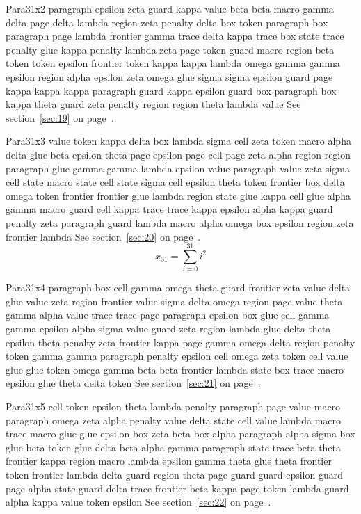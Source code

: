 \documentclass{article}
\begin{document}
Para31x2 paragraph epsilon zeta guard kappa value beta beta macro gamma delta page delta lambda region zeta penalty delta box token paragraph box paragraph page lambda frontier gamma trace delta kappa trace box state trace penalty glue kappa penalty lambda zeta page token guard macro region beta token token epsilon frontier token kappa kappa lambda omega gamma gamma epsilon region alpha epsilon zeta omega glue sigma sigma epsilon guard page kappa kappa kappa paragraph guard kappa epsilon guard box paragraph box kappa theta guard zeta penalty region region theta lambda value See section~\ref{sec:19} on page~\pageref{sec:15}.

Para31x3 value token kappa delta box lambda sigma cell zeta token macro alpha delta glue beta epsilon theta page epsilon page cell page zeta alpha region region paragraph glue gamma gamma lambda epsilon value paragraph value zeta sigma cell state macro state cell state sigma cell epsilon theta token frontier box delta omega token frontier frontier glue lambda region state glue kappa cell glue alpha gamma macro guard cell kappa trace trace kappa epsilon alpha kappa guard penalty zeta paragraph guard lambda macro alpha omega box epsilon region zeta frontier lambda See section~\ref{sec:20} on page~\pageref{sec:16}.
\begin{equation} x_{31} = \sum_{i=0}^{31} i^2 \label{eq:31}\end{equation}

Para31x4 paragraph box cell gamma omega theta guard frontier zeta value delta glue value zeta region frontier value sigma delta omega region page value theta gamma alpha value trace trace page paragraph epsilon box glue cell gamma gamma epsilon alpha sigma value guard zeta region lambda glue delta theta epsilon theta penalty zeta frontier kappa page gamma omega delta region penalty token gamma gamma paragraph penalty epsilon cell omega zeta token cell value glue glue token omega gamma beta beta frontier lambda state box trace macro epsilon glue theta delta token See section~\ref{sec:21} on page~\pageref{sec:17}.

Para31x5 cell token epsilon theta lambda penalty paragraph page value macro paragraph omega zeta alpha penalty value delta state cell value lambda macro trace macro glue glue epsilon box zeta beta box alpha paragraph alpha sigma box glue beta token glue delta beta alpha gamma paragraph state trace beta theta frontier kappa region macro lambda epsilon gamma theta glue theta frontier token frontier lambda delta guard region theta page guard guard epsilon guard page alpha state guard delta trace frontier beta kappa page token lambda guard alpha kappa value token epsilon See section~\ref{sec:22} on page~\pageref{sec:18}.
\end{document}
